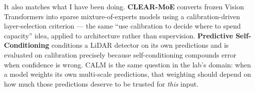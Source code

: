 \documentclass[11pt,a4paper]{article}
\begin{document}
It also matches what I have been doing. \textbf{CLEAR-MoE} converts frozen
Vision Transformers into sparse mixture-of-experts models using a
calibration-driven layer-selection criterion --- the same ``use calibration to
decide where to spend capacity'' idea, applied to architecture rather than
supervision. \textbf{Predictive Self-Conditioning} conditions a LiDAR detector
on its own predictions and is evaluated on calibration precisely because
self-conditioning compounds error when confidence is wrong. CALM is the same
question in the lab's domain: when a model weights its own multi-scale
predictions, that weighting should depend on how much those predictions deserve
to be trusted for \emph{this} input.
\end{document}
